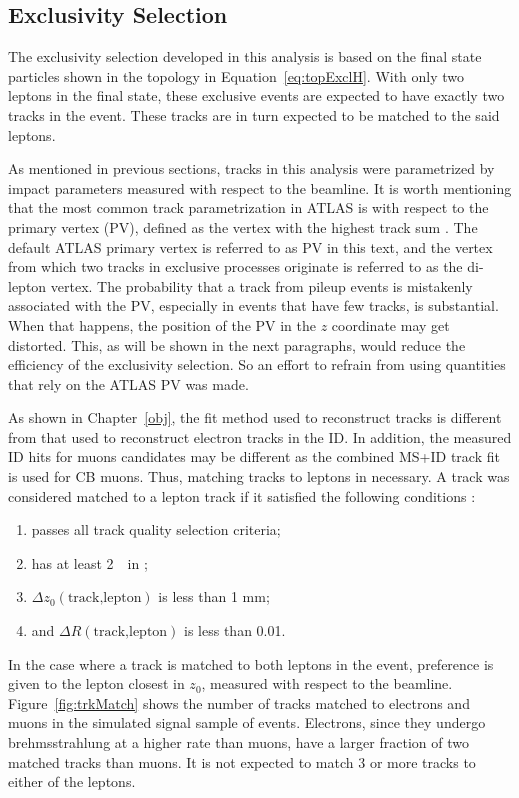 \subsection{Exclusivity Selection}
\par The exclusivity selection developed in this analysis is based on the final state particles 
shown in the topology in Equation~\ref{eq:topExclH}. With only two leptons in the final state, these 
exclusive events are expected to have exactly two tracks in the event. These tracks are in turn expected 
to be matched to the said leptons.  

\par As mentioned in previous sections, tracks in this analysis were parametrized by impact parameters 
measured with respect to the beamline. It is worth mentioning that the most common track 
parametrization in ATLAS is with respect to the primary vertex (PV), defined as the vertex with the 
highest track sum \pt. The default ATLAS primary vertex is referred to as PV in this text, and the vertex from which two tracks 
in exclusive processes originate is referred to as the di-lepton vertex. The 
probability that a track from pileup events is mistakenly associated with the PV, especially 
in events that have few tracks, is substantial. When that happens, the position of the PV in 
the $z$ coordinate may get distorted. This, as will be shown in the next paragraphs, would reduce 
the efficiency of the exclusivity selection. So an effort to refrain from using quantities that 
rely on the ATLAS PV was made.  

\par As shown in Chapter~\ref{obj}, the fit method used to reconstruct tracks is different 
from that used to reconstruct electron tracks in the ID. In addition, the measured ID hits for 
muons candidates may be different as the combined MS+ID track fit is used for CB muons. Thus, 
matching tracks to leptons in necessary. A track was considered matched to a lepton track if it 
satisfied the following conditions :
\begin{enumerate}
\item passes all track quality selection criteria;
\item has at least 2~\GeV\ in \pt;
\item $\Delta z_0(\text{track,lepton})$ is less than 1 mm;
\item and $\Delta R(\text{track,lepton})$ is less than 0.01.
\end{enumerate}   
In the case where a track is matched to both leptons in the event, preference is given to the lepton 
closest in $z_0$, measured with respect to the beamline. Figure~\ref{fig:trkMatch} shows the number of tracks 
matched to electrons and muons in the  simulated signal sample of events. Electrons, since they undergo 
brehmsstrahlung at a higher rate than muons, have a larger fraction of two matched tracks than muons. It 
is not expected to match 3 or more tracks to either of the leptons. 


